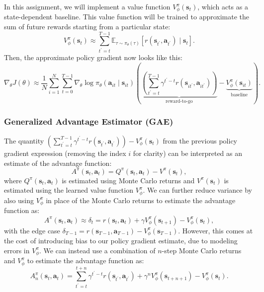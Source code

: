 \documentclass{article}
\def\rva{{\mathbf{a}}}
\def\rvs{{\mathbf{s}}}
\begin{document}
In this assignment, we will implement a value function $V_{\phi}^{\pi}(\rvs_t)$, which acts as a state-dependent baseline. This value function will be trained to approximate the sum of future rewards starting from a particular state:
\begin{equation}
    V_{\phi}^{\pi}\left(\rvs_{t}\right) \approx \sum_{t^{\prime}=t}^{T-1} \mathbb{E}_{\tau \sim \pi_{\theta}(\tau)}\left[r\left(\rvs_{t^{\prime}}, \rva_{t^{\prime}}\right) \mid \rvs_{t}\right].
\end{equation}
Then, the approximate policy gradient now looks like this:
\begin{equation}
    \nabla_{\theta} J(\theta) \approx \frac{1}{N} \sum_{i=1}^{N} \sum_{t=0}^{T-1} \nabla_{\theta} \log \pi_{\theta}\left(\rva_{i t} \mid \rvs_{i t}\right)\left(
        \underbrace{\left(\sum_{t^{\prime}=t}^{T-1} \gamma^{t^{\prime}-t} r\left(\rvs_{i t^{\prime}}, \rva_{i t^{\prime}}\right)
    \right)}_\textrm{reward-to-go}
    -
    \underbrace{V_{\phi}^{\pi}\left(\rvs_{i t}\right)}_\textrm{baseline}\right).
\end{equation}

\subsubsection{Generalized Advantage Estimator (GAE)}

The quantity $\left(\sum_{t^{\prime}=t}^{T-1} \gamma^{t^{\prime}-t} r\left(\rvs_{t^{\prime}}, \rva_{t^{\prime}}\right)\right)-V_{\phi}^{\pi}\left(\rvs_{t}\right)$ from the previous policy gradient expression (removing the index $i$ for clarity) can be interpreted as an estimate of the advantage function:
\begin{equation}
    A^{\pi}\left(\rvs_{t}, \rva_{t}\right)=Q^{\pi}\left(\rvs_{t}, \rva_{t}\right)-V^{\pi}\left(\rvs_{t}\right),
\end{equation}
where $Q^{\pi}\left(\rvs_{t}, \rva_{t}\right)$ is estimated using Monte Carlo returns and $V^{\pi}\left(\rvs_{t}\right)$ is estimated using the learned value function $V_{\phi}^{\pi}$. We can further reduce variance by also using $V_{\phi}^{\pi}$ in place of the Monte Carlo returns to estimate the advantage function as:
\begin{equation}
    A^{\pi}\left(\rvs_{t}, \rva_{t}\right) \approx \delta_{t}=r\left(\rvs_{t}, \rva_{t}\right)+\gamma V_{\phi}^{\pi}\left(\rvs_{t+1}\right)-V_{\phi}^{\pi}\left(\rvs_{t}\right),
\end{equation}
with the edge case $\delta_{T-1}=r\left(\rvs_{T-1}, \rva_{T-1}\right)-V_{\phi}^{\pi}\left(\rvs_{T-1}\right)$. However, this comes at the cost of introducing bias to our policy gradient estimate, due to modeling errors in $V_{\phi}^{\pi}$. We can instead use a combination of $n$-step Monte Carlo returns and $V_{\phi}^{\pi}$ to estimate the advantage function as:
\begin{equation}
    A_{n}^{\pi}\left(\rvs_{t}, \rva_{t}\right)=\sum_{t^{\prime}=t}^{t+n} \gamma^{t^{\prime}-t} r\left(\rvs_{t^{\prime}}, \rva_{t^{\prime}}\right)+\gamma^{n} V_{\phi}^{\pi}\left(\rvs_{t+n+1}\right)-V_{\phi}^{\pi}\left(\rvs_{t}\right).
\end{equation}
\end{document}
